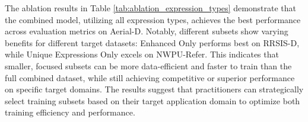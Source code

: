 The ablation results in Table \ref{tab:ablation_expression_types} demonstrate that the combined model, utilizing all expression types, achieves the best performance across evaluation metrics on Aerial-D. Notably, different subsets show varying benefits for different target datasets: Enhanced Only performs best on RRSIS-D, while Unique Expressions Only excels on NWPU-Refer. This indicates that smaller, focused subsets can be more data-efficient and faster to train than the full combined dataset, while still achieving competitive or superior performance on specific target domains. The results suggest that practitioners can strategically select training subsets based on their target application domain to optimize both training efficiency and performance.

\begin{table*}[t]
\centering
\caption{Ablation Study: Cross-Dataset Performance by Training Configuration}
\label{tab:ablation_expression_types}
\end{table*}

